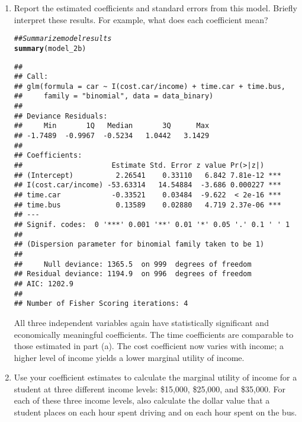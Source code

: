 \documentclass[11pt,letterpaper]{article}\usepackage[]{graphicx}\usepackage[]{color}
\makeatletter
\newcommand{\hlcom}[1]{\textcolor[rgb]{0.678,0.584,0.686}{\textit{#1}}}%
\newcommand{\hlstd}[1]{\textcolor[rgb]{0.345,0.345,0.345}{#1}}%
\newcommand{\hlkwd}[1]{\textcolor[rgb]{0.737,0.353,0.396}{\textbf{#1}}}%
\newenvironment{kframe}{%
 \def\at@end@of@kframe{}%
 \ifinner\ifhmode%
  \def\at@end@of@kframe{\end{minipage}}%
  \begin{minipage}{\columnwidth}%
 \fi\fi%
 \def\FrameCommand##1{\hskip\@totalleftmargin \hskip-\fboxsep
 \colorbox{shadecolor}{##1}\hskip-\fboxsep
     \hskip-\linewidth \hskip-\@totalleftmargin \hskip\columnwidth}%
 \MakeFramed {\advance\hsize-\width
   \@totalleftmargin\z@ \linewidth\hsize
   \@setminipage}}%
 {\par\unskip\endMakeFramed%
 \at@end@of@kframe}
\newenvironment{knitrout}{}{} %
\makeatother
\begin{document}
\begin{enumerate}[label=\alph*., leftmargin=*]
	\begin{enumerate}[label=\roman*.]
		\item Report the estimated coefficients and standard errors from this model. Briefly interpret these results. For example, what does each coefficient mean?

\begin{knitrout}
\color{fgcolor}\begin{kframe}
\begin{alltt}
\hlcom{## Summarize model results}
\hlkwd{summary}\hlstd{(model_2b)}
\end{alltt}
\begin{verbatim}
## 
## Call:
## glm(formula = car ~ I(cost.car/income) + time.car + time.bus, 
##     family = "binomial", data = data_binary)
## 
## Deviance Residuals: 
##     Min       1Q   Median       3Q      Max  
## -1.7489  -0.9967  -0.5234   1.0442   3.1429  
## 
## Coefficients:
##                     Estimate Std. Error z value Pr(>|z|)    
## (Intercept)          2.26541    0.33110   6.842 7.81e-12 ***
## I(cost.car/income) -53.63314   14.54884  -3.686 0.000227 ***
## time.car            -0.33521    0.03484  -9.622  < 2e-16 ***
## time.bus             0.13589    0.02880   4.719 2.37e-06 ***
## ---
## Signif. codes:  0 '***' 0.001 '**' 0.01 '*' 0.05 '.' 0.1 ' ' 1
## 
## (Dispersion parameter for binomial family taken to be 1)
## 
##     Null deviance: 1365.5  on 999  degrees of freedom
## Residual deviance: 1194.9  on 996  degrees of freedom
## AIC: 1202.9
## 
## Number of Fisher Scoring iterations: 4
\end{verbatim}
\end{kframe}
\end{knitrout}

		All three independent variables again have statistically significant and economically meaningful coefficients. The time coefficients are comparable to those estimated in part (a). The cost coefficient now varies with income; a higher level of income yields a lower marginal utility of income. 

		\item Use your coefficient estimates to calculate the marginal utility of income for a student at three different income levels: \$15,000, \$25,000, and \$35,000. For each of these three income levels, also calculate the dollar value that a student places on each hour spent driving and on each hour spent on the bus.


\end{enumerate}
\end{enumerate}
\end{document}
